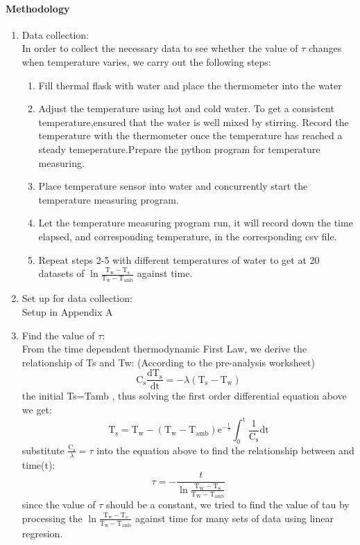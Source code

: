 \documentclass[10pt]{article}
\begin{document}
\paragraph{Methodology}
\begin{enumerate}
\item Data collection:\\
In order to collect the necessary data to see whether the value of  $\tau$ changes when temperature varies, we carry out the following steps:
\begin{enumerate}
\item Fill thermal flask with water and place the thermometer into the water
\item Adjust the temperature using hot and cold water. To get a consistent temperature,ensured that the water is well mixed by stirring. Record the temperature with the thermometer once the temperature has reached a steady temeperature.Prepare the python program for temperature measuring.
\item Place temperature sensor into water and concurrently start the temperature measuring program.
\item Let the temperature measuring program run, it will record down the time elapsed, and corresponding temperature,  in the corresponding csv file.
\item Repeat steps 2-5 with different temperatures of water to get at 20 datasets of $\ln\frac{\mathrm{T}_{\mathrm{w}}-\mathrm{T}_{\mathrm{s}}}{\mathrm{T}_{\mathrm{w}}-\mathrm{T}_{\mathrm{amb}}}$ against time.
\end{enumerate}
\item Set up for data collection:\\
Setup in Appendix A
\item Find the value of $\tau$:\\
From the time dependent thermodynamic First Law, we derive the relationship of  Ts and Tw: (According to the pre-analysis worksheet)
\begin{equation}
\mathrm{C}_{\mathrm{s}} \frac{\mathrm{dT}_{\mathrm{s}}}{\mathrm{dt}}=-\lambda\left(\mathrm{T}_{\mathrm{s}}-\mathrm{T}_{\mathrm{w}}\right)
\end{equation}
the initial  Ts=Tamb , thus solving the first order differential equation above we get:
\begin{equation}
\mathrm{T}_{\mathrm{s}}=\mathrm{T}_{\mathrm{w}}-\left(\mathrm{T}_{\mathrm{w}}-\mathrm{T}_{\mathrm{amb}}\right) \mathrm{e}^{-\frac{\mathrm{t}}{\tau}} \int_{0}^{\mathrm{t}} \frac{1}{\mathrm{C}_{\mathrm{s}}} \mathrm{dt}
\end{equation}
substitute $\frac{\mathrm{C}_{\mathrm{s}}}{\lambda}=\tau$ into the equation above to find the relationship between and time(t):
\begin{equation}
\tau=-\frac{t}{\ln \frac{\mathrm{T}_{\mathrm{W}}-\mathrm{T}_{\mathrm{S}}}{\mathrm{T}_{\mathrm{W}}-\mathrm{T}_{\mathrm{amb}}}}
\end{equation}
since the value of $\tau$ should be a constant, we tried to find the value of tau by processing the $\ln\frac{\mathrm{T}_{\mathrm{w}}-\mathrm{T}_{\mathrm{s}}}{\mathrm{T}_{\mathrm{w}}-\mathrm{T}_{\mathrm{amb}}}$ against time for many sets of data using linear regresion.
\end{enumerate}
\end{document}
